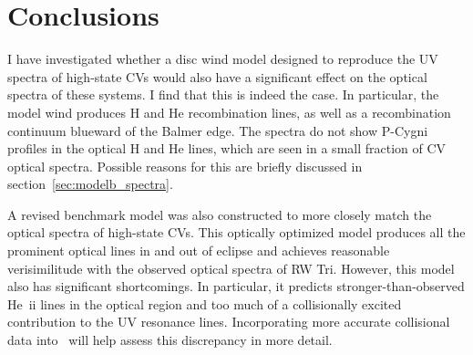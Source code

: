 


%
%


\section{Conclusions}
\label{sec:cv_conclusions}

I have investigated whether a disc wind model designed to reproduce
the UV spectra of high-state CVs would also have a significant effect
on the optical spectra of these systems. I find that this is indeed
the case. In particular, the model wind produces H and He
recombination lines, as well as a recombination continuum blueward of
the Balmer edge. The spectra do not show P-Cygni profiles
in the optical H and He lines, which are seen in a small fraction of CV 
optical spectra. Possible reasons for this are briefly discussed in 
section~\ref{sec:modelb_spectra}.

A revised benchmark model was also constructed
to more closely match the optical spectra of high-state CVs. This
optically optimized model produces all the prominent optical lines in
and out of eclipse and achieves reasonable verisimilitude with the
observed optical spectra of RW Tri. However, this model also has
significant shortcomings. In particular, it predicts
stronger-than-observed He~{\sc ii} lines in the optical region and too
much of a collisionally excited contribution to the UV resonance lines. 
Incorporating more accurate collisional data into \py\ will help
assess this discrepancy in more detail.

